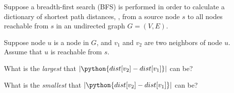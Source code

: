 \begin{prob}

    Suppose a breadth-first search (BFS) is performed in order to calculate a
    dictionary of shortest path distances, , from a source node
    $s$ to all nodes reachable from $s$ in an undirected graph $G = (V, E)$.

    Suppose node $u$ is a node in $G$, and $v_1$ and $v_2$ are two neighbors of
    node $u$. Assume that $u$ is reachable from $s$.

    \begin{subprobset}

        \begin{subprob}
            What is the \emph{largest} that $|\python{dist[v_2] - dist[v_1]}|$ can be?


        \end{subprob}

        \begin{subprob}
            What is the \emph{smallest} that $|\python{dist[v_2] - dist[v_1]}|$ can be?

        \end{subprob}

    \end{subprobset}

\end{prob}
